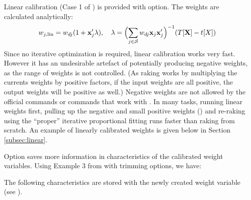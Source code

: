 Linear calibration (Case 1 of \citet{deville:sarndal:1992}) is provided with
 option. The weights are calculated analytically:
\begin{equation}
    \label{eq:linear:weight}
    w_{j,\rm{lin}} = w_{dj} (1+\mathbf{x}_j'\mathbf{\lambda}),
    \quad
    \mathbf{\lambda} = \Bigl( \sum_{j \in \mathcal{S}} w_{dj} \mathbf{x}_j \mathbf{x}_j' \Bigr)^{-1}
        ( T [ \mathbf{X}  ] - t[X] )
\end{equation}
Since no iterative optimization is required, linear calibration works very fast.
However it has an undesirable artefact of potentially producing negative weights,
as the range of weights is not controlled. (As raking works by multiplying the currents
weights by positive factors, if the input weights are all positive, the output weights
will be positive as well.) Negative weights are not allowed by the official  commands
or commands that work with \stcmd{[pweights]}.
In many tasks, running linear weights first,
pulling up the negative and small positive weights ()
and re-raking using the ``proper'' iterative proportional fitting runs faster than
raking from scratch. An example of linearly calibrated weights is given below
in Section \ref{subsec:linear}.

Option  saves more information in characteristics of the calibrated
weight variables. Using Example 3 from \citet{kolenikov:2014} with trimming options,
we have:


\begin{stlog}
\nullskip
\end{stlog}

The following characteristics are stored with the newly created weight variable
(see ).

